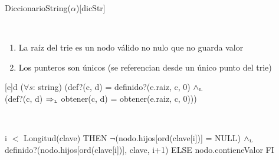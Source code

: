 \begin{Representacion}


	\begin{Estructura}{DiccionarioString($\alpha$)}[dicStr]

		\begin{Tupla}[dicStr]
		\end{Tupla}

		~

		\begin{Tupla}[Nodo]
		\end{Tupla}

	\end{Estructura}


	\begin{enumerate}

		\item La raíz del trie es un nodo válido no nulo que no guarda valor

		\item Los punteros son únicos (se referencian desde un único punto del trie)

	\end{enumerate}




	\Abs[dicStr]{\dicString}[e]{d}
	{($\forall s$: string)
	(def?(c, d) = definido?(e.raiz, c, 0) $\land_{\mathrm{\scriptscriptstyle{L}}}$ \\
	(def?(c, d) $\Rightarrow_{\mathrm{\scriptscriptstyle{L}}}$ obtener(c, d) = obtener(e.raiz, c, 0)))
	}

	~

	{\IF i $<$ Longitud(clave) THEN
		$\neg$(nodo.hijos[ord(clave[i])] = NULL) $\land_{\mathrm{\scriptscriptstyle{L}}}$ \\ definido?(nodo.hijos[ord(clave[i])], clave, i+1)
	ELSE
		nodo.contieneValor
	FI}



\end{Representacion}
